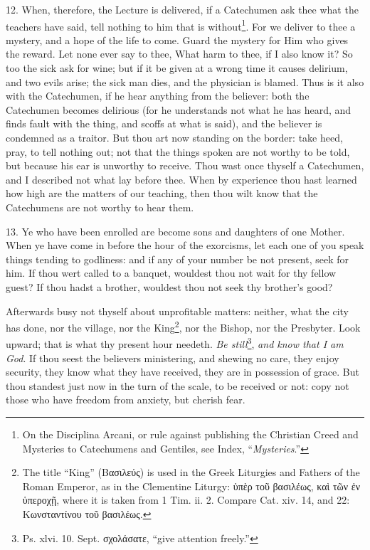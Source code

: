 12. When, therefore, the Lecture is delivered, if a Catechumen ask thee what the teachers have said, tell nothing to him that is without\footnote{On the Disciplina Arcani, or rule against publishing the Christian Creed and Mysteries to Catechumens and Gentiles, see Index, “\emph{Mysteries}.”}. For we deliver to thee a mystery, and a hope of the life to come. Guard the mystery for Him who gives the reward. Let none ever say to thee, What harm to thee, if I also know it? So too the sick ask for wine; but if it be given at a wrong time it causes delirium, and two evils arise; the sick man dies, and the physician is blamed. Thus is it also with the Catechumen, if he hear anything from the believer: both the Catechumen becomes delirious (for he understands not what he has heard, and finds fault with the thing, and scoffs at what is said), and the believer is condemned as a traitor. But thou art now standing on the border: take heed, pray, to tell nothing out; not that the things spoken are not worthy to be told, but because his ear is unworthy to receive. Thou wast once thyself a Catechumen, and I described not what lay before thee. When by experience thou hast learned how high are the matters of our teaching, then thou wilt know that the Catechumens are not worthy to hear them.

13. Ye who have been enrolled are become sons and daughters of one Mother. When ye have come in before the hour of the exorcisms, let each one of you speak things tending to godliness: and if any of your number be not present, seek for him. If thou wert called to a banquet, wouldest thou not wait for thy fellow guest? If thou hadst a brother, wouldest thou not seek thy brother’s good?

Afterwards busy not thyself about unprofitable matters: neither, what the city has done, nor the village, nor the King\footnote{The title “King” (\textgreek{Βασιλεύς}) is used in the Greek Liturgies and Fathers of the Roman Emperor, as in the Clementine Liturgy: \textgreek{ὑπὲρ τοῦ βασιλέως, καὶ τῶν ἐν ὑπεροχῇ}, where it is taken from 1 Tim. ii. 2. Compare Cat. xiv. 14, and 22: \textgreek{Κωνσταντίνου τοῦ βασιλέως}.}, nor the Bishop, nor the Presbyter. Look upward; that is what thy present hour needeth. \emph{Be still}\footnote{Ps. xlvi. 10. Sept. \textgreek{σχολάσατε}, “give attention freely.”}, \emph{and know that I am God}. If thou seest the believers ministering, and shewing no care, they enjoy security, they know what they have received, they are in possession of grace. But thou standest just now in the turn of the scale, to be received or not: copy not those who have freedom from anxiety, but cherish fear.

